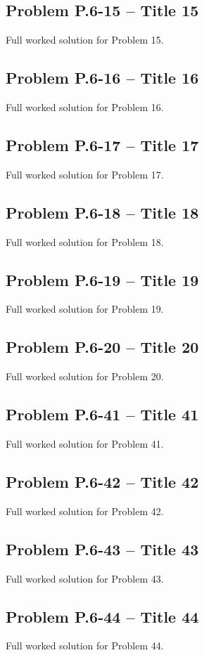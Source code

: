 \documentclass[12pt]{article}
\begin{document}
\subsection*{Problem P.6-15 – Title 15}
Full worked solution for Problem 15.


\subsection*{Problem P.6-16 – Title 16}
Full worked solution for Problem 16.


\subsection*{Problem P.6-17 – Title 17}
Full worked solution for Problem 17.


\subsection*{Problem P.6-18 – Title 18}
Full worked solution for Problem 18.


\subsection*{Problem P.6-19 – Title 19}
Full worked solution for Problem 19.


\subsection*{Problem P.6-20 – Title 20}
Full worked solution for Problem 20.


\subsection*{Problem P.6-41 – Title 41}
Full worked solution for Problem 41.


\subsection*{Problem P.6-42 – Title 42}
Full worked solution for Problem 42.


\subsection*{Problem P.6-43 – Title 43}
Full worked solution for Problem 43.


\subsection*{Problem P.6-44 – Title 44}
Full worked solution for Problem 44.
\end{document}
